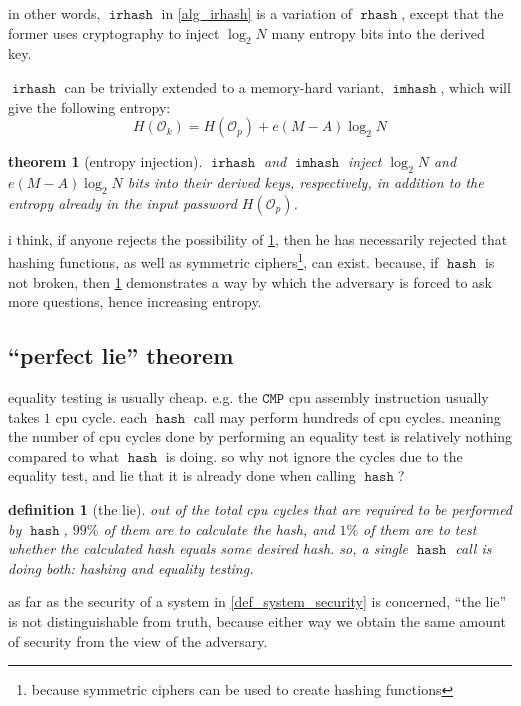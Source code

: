 \documentclass[twocolumn]{article}
\newtheorem{definition}{definition}
\newtheorem{theorem}{theorem}
\DeclareMathOperator{\hash}{\mathtt{hash}}
\DeclareMathOperator{\rhash}{\mathtt{rhash}}
\DeclareMathOperator{\irhash}{\mathtt{irhash}}
\DeclareMathOperator{\imhash}{\mathtt{imhash}}
\begin{document}
in other words, $\irhash$ in \cref{alg_irhash} is a variation of $\rhash$,
except that the former uses cryptography to inject $\log_2 N$ many entropy
bits into the derived key.

$\irhash$ can be trivially extended to a memory-hard variant, $\imhash$,
which will give the following entropy:
\begin{equation}
    H(\mathcal{O}_k) = H(\mathcal{O}_p) + e(M-A)\log_2 N
\end{equation}

\begin{theorem}[entropy injection]\label{theorem_entropy_injection}
    $\irhash$ and $\imhash$ inject $\log_2 N$ and $e(M-A)\log_2 N$ bits
    into their derived keys, respectively, in addition to the entropy
    already in the input password $H(\mathcal{O}_p)$.
\end{theorem}

i think, if anyone rejects the possibility of
\cref{theorem_entropy_injection}, then he has necessarily rejected that
hashing functions, as well as symmetric ciphers\footnote{because symmetric
ciphers can be used to create hashing functions}, can exist.  because, if
$\hash$ is not broken, then \cref{theorem_entropy_injection} demonstrates a
way by which the adversary is forced to ask more questions, hence
increasing entropy.

\subsection{``perfect lie'' theorem}
equality testing is usually cheap.  e.g. the $\texttt{CMP}$ cpu assembly
instruction usually takes $1$ cpu cycle.  each $\hash$ call may perform
hundreds of cpu cycles.  meaning the number of cpu cycles done by
performing an equality test is relatively nothing compared to what $\hash$
is doing.  so why not ignore the cycles due to the equality test, and lie
that it is already done when calling $\hash$?

\begin{definition}[the lie]
    out of the total cpu cycles that are required to be performed by
    $\hash$, $99\%$ of them are to calculate the hash, and $1\%$ of them
    are to test whether the calculated hash equals some desired hash.  so,
    a single $\hash$ call is doing both: hashing and equality testing.
\end{definition}

as far as the security of a system in \cref{def_system_security} is
concerned, ``the lie'' is not distinguishable from truth, because either
way we obtain the same amount of security from the view of the adversary.
\end{document}
